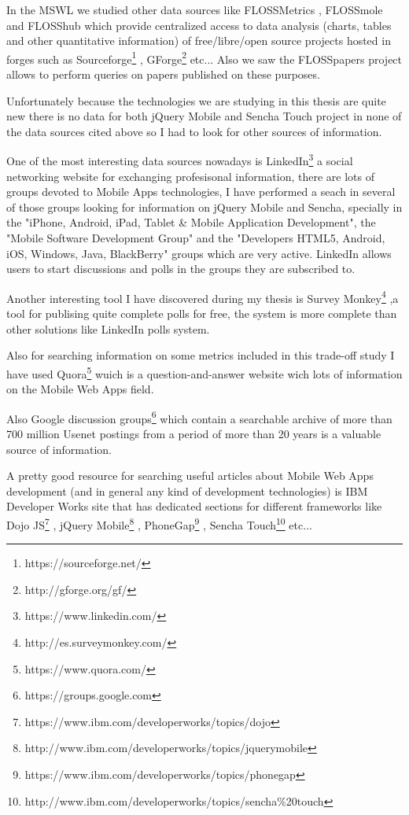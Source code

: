 \documentclass[a4paper,12pt]{book}
\begin{document}
In the MSWL we studied other data sources like FLOSSMetrics\cite{FLOSSMetrics} , FLOSSmole\cite{FLOSSmole} and FLOSShub\cite{FLOSShub} which provide centralized access to data analysis (charts, tables and other quantitative information) of free/libre/open source projects hosted in forges such as Sourceforge\footnote{https://sourceforge.net/} , GForge\footnote{http://gforge.org/gf/}  etc... Also we saw the FLOSSpapers project\cite{FLOSSpapers} allows to perform queries on papers published on these purposes.

Unfortunately because the technologies we are studying in this thesis are quite new there is no data for both jQuery Mobile and Sencha Touch project in none of the data sources cited above so I had to look for other sources of information.

One of the most interesting data sources nowadays is LinkedIn\footnote{https://www.linkedin.com/}  a social networking website for exchanging profesisonal information, there are lots of groups devoted to Mobile Apps technologies, I have performed a seach in several of those groups looking for information on jQuery Mobile and Sencha, specially in the "iPhone, Android, iPad, Tablet \& Mobile Application Development"\cite{linkedin1},  the "Mobile Software Development Group"\cite{linkedin2} and the "Developers HTML5, Android, iOS, Windows, Java, BlackBerry"\cite{linkedin3} groups which are very active. LinkedIn allows users to start discussions and polls in the groups they are subscribed to. 

Another interesting tool I have discovered during my thesis is Survey Monkey\footnote{http://es.surveymonkey.com/} ,a tool for publising quite complete polls for free, the system is more complete than other solutions like LinkedIn polls system.

Also for searching information on some metrics included in this trade-off study I have used Quora\footnote{https://www.quora.com/}  wuich is a question-and-answer website wich lots of information on the Mobile Web Apps field.

Also Google discussion groups\footnote{https://groups.google.com} which contain a searchable archive of more than 700 million Usenet postings from a period of more than 20 years is a valuable source of information.

A pretty good resource for searching useful articles about Mobile Web Apps development (and in general any kind of development technologies) is IBM Developer Works site that has dedicated sections for different frameworks like Dojo JS\footnote{https://www.ibm.com/developerworks/topics/dojo} , jQuery Mobile\footnote{http://www.ibm.com/developerworks/topics/jquerymobile} , PhoneGap\footnote{https://www.ibm.com/developerworks/topics/phonegap} , Sencha Touch\footnote{http://www.ibm.com/developerworks/topics/sencha\%20touch}  etc...	 
\end{document}
